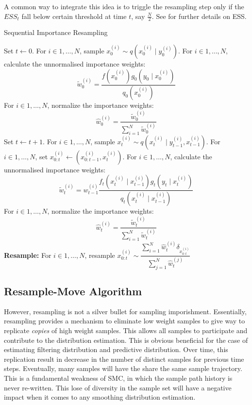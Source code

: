 A common way to integrate this idea is to triggle the resampling step only if the $ESS_t$ fall below certain threshold at time $t$, say $\frac{N}{2}$. See \cite{JAM10} for further details on ESS.

\begin{algorithm}
\caption{Sequential Importance Resampling}\label{algo:sir}
\begin{algorithmic}[1]
\State Set $t \gets 0$.
\State For $i \in 1, \ldots, N$, sample $x^{(i)}_0 \sim q(x^{(i)}_0 \mid y^{(i)}_0)$.
\State For $i \in 1, \ldots, N$, calculate the unnormalised importance weights:
\begin{equation*}
 \tilde{w}^{(i)}_0 = \dfrac{f(x_0^{(i)})g_0(y_0 \mid x^{(i)}_0)}{q_0(x^{(i)}_0)}
\end{equation*}
\State For $i \in 1, \ldots, N$, normalize the importance weights:
\begin{equation*}
\hat{w}^{(i)}_0 = \dfrac{\tilde{w}^{(i)}_0}{\sum^N_{i=1} \tilde{w}^{(i)}_0}
\end{equation*}
\State Set $t \gets t + 1$.
\State For $i \in 1, \ldots, N$, sample $x^{(i)}_t \sim q(x^{(i)}_t \mid y^{(i)}_{t-1}, x^{(i)}_{t-1})$.
\State For $i \in 1, \ldots, N$, set $x^{(i)}_{0:t} \gets (x^{(i)}_{0:t-1}, x^{(i)}_t)$.
\State For $i \in 1, \ldots, N$, calculate the unnormalised importance weights:
\begin{equation*}
 \tilde{w}^{(i)}_t = w^{(i)}_{t-1} \dfrac{f_t(x^{(i)}_t \mid x^{(i)}_{t-1})g_t(y_t \mid x^{(i)}_t)}{q_t(x^{(i)}_t \mid x^{(i)}_{t-1})}
\end{equation*}
\State For $i \in 1, \ldots, N$, normalize the importance weights:
\begin{equation*}
\hat{w}^{(i)}_t = \dfrac{\tilde{w}^{(i)}_t}{\sum^N_{i=1} \tilde{w}^{(i)}_t}
\end{equation*}
\State \textbf{Resample:} For $i \in 1, \ldots, N$, resample $ x^{(i)}_{0:t} \sim \dfrac{\sum^N_{i=1}\hat{w}^{(i)}_t\delta_{x^{(i)}_{0:t}}}{\sum^N_{j=1} \hat{w}^{(j)}_t}$
\EndWhile
\EndFunction
\end{algorithmic}
\end{algorithm}

\subsection{Resample-Move Algorithm}
\label{sec:rm}
However, resampling is not a silver bullet for sampling imporishment. Essentially, resampling provides a mechanism to eliminate low weight samples to give way to replicate \emph{copies} of high weight samples. This allows all samples to participate and contribute to the distribution estimation. This is obvious beneficial for the case of estimating filtering distribution and predictive distribution. Over time, this replication result in decrease in the number of distinct samples for previous time steps. Eventually, many samples will have the share the same sample trajectory. This is a fundamental weakness of SMC, in which the sample path history is never re-written. This lose of diversity in the sample set will have a negative impact when it comes to any smoothing distribution estimation. 

